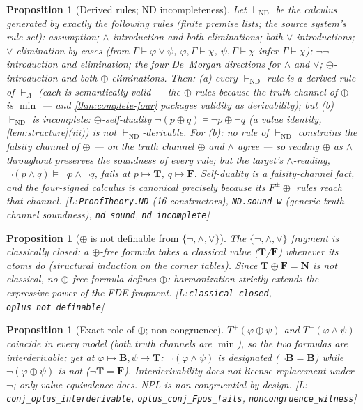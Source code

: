 \documentclass[11pt,a4paper]{article}
\newtheorem{proposition}[theorem]{Proposition}
\theoremstyle{definition}
\newcommand{\vT}{\mathbf{T}}
\newcommand{\vF}{\mathbf{F}}
\newcommand{\vB}{\mathbf{B}}
\newcommand{\vN}{\mathbf{N}}
\newcommand{\hmz}{\oplus}                       %
\newcommand{\Tp}{T^{+}}\newcommand{\Tm}{T^{-}}
\newcommand{\dershort}{\vdash_{\!A}}
\newcommand{\ndder}{\vdash_{\mathrm{ND}}}
\newcommand{\lean}[1]{\texttt{#1}}
\begin{document}
\begin{proposition}[Derived rules; ND incompleteness]\label{prop:nd}
Let $\ndder$ be the calculus generated by exactly the following rules
(finite premise lists; the source system's rule set):
assumption; $\wedge$-introduction and both eliminations; both
$\vee$-introductions; $\vee$-elimination by cases (from
$\Gamma\vdash\varphi\vee\psi$, $\varphi,\Gamma\vdash\chi$,
$\psi,\Gamma\vdash\chi$ infer $\Gamma\vdash\chi$); $\lnot\lnot$-introduction
and elimination; the four De~Morgan directions for $\wedge$ and $\vee$;
$\hmz$-introduction and both $\hmz$-eliminations. Then:
(a) every $\ndder$-rule is a derived rule of $\dershort$ (each is
semantically valid --- the $\hmz$-rules because the truth channel of $\hmz$
is $\min$ --- and \cref{thm:complete-four} packages validity as
derivability); but
(b) $\ndder$ is \emph{incomplete}: $\hmz$-self-duality
$\lnot(p\hmz q)\models\lnot p\hmz\lnot q$ (a value identity,
\cref{lem:structure}(iii)) is not $\ndder$-derivable.
For (b): no rule of $\ndder$ constrains the falsity channel of $\hmz$ ---
on the truth channel $\hmz$ and $\wedge$ agree --- so reading $\hmz$ as
$\wedge$ throughout preserves the soundness of every rule; but the target's
$\wedge$-reading, $\lnot(p\wedge q)\models\lnot p\wedge\lnot q$, fails at
$p\mapsto\vT$, $q\mapsto\vF$. Self-duality is a falsity-channel fact, and
the four-signed calculus is canonical precisely because its
$F^{\pm}\hmz$ rules reach that channel.
[L:\,\lean{ProofTheory.ND} (16 constructors), \lean{ND.sound\_w} (generic
truth-channel soundness), \lean{nd\_sound}, \lean{nd\_incomplete}]
\end{proposition}

\begin{proposition}[$\hmz$ is not definable from $\{\lnot,\wedge,\vee\}$]\label{prop:primitive}
The $\{\lnot,\wedge,\vee\}$ fragment is classically closed: a $\hmz$-free
formula takes a classical value ($\vT$/$\vF$) whenever its atoms do
(structural induction on the corner tables). Since
$\vT\hmz\vF=\vN$ is not classical, no $\hmz$-free formula defines $\hmz$:
harmonization strictly extends the expressive power of the FDE fragment.
[L:\,\lean{classical\_closed}, \lean{oplus\_not\_definable}]
\end{proposition}

\begin{proposition}[Exact role of $\hmz$; non-congruence]\label{prop:oplus}
$\Tp(\varphi\hmz\psi)$ and $\Tp(\varphi\wedge\psi)$ coincide in every model
(both truth channels are $\min$), so the two formulas are interderivable;
yet at $\varphi\mapsto\vB,\psi\mapsto\vT$: $\lnot(\varphi\wedge\psi)$ is
designated ($\lnot\vB=\vB$) while $\lnot(\varphi\hmz\psi)$ is not
($\lnot\vT=\vF$). Interderivability does not license replacement under
$\lnot$; only value equivalence does. NPL is non-congruential by design.
[L:\,\lean{conj\_oplus\_interderivable}, \lean{oplus\_conj\_Fpos\_fails},
\lean{noncongruence\_witness}]
\end{proposition}
\end{document}
